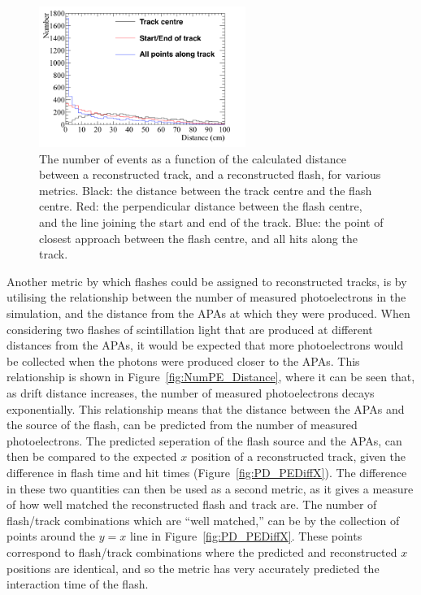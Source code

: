 \begin{figure}
  \centering
  \includegraphics[width=0.6\textwidth]{DiffTrackSeps}
  \caption[Matching tracks and flashes in the 35 ton using positions in the $yz$ plane]
          {The number of events as a function of the calculated distance between a reconstructed track, and a reconstructed flash, for various metrics. Black: the distance between the track centre and the flash centre. Red: the perpendicular distance between the flash centre, and the line joining the start and end of the track. Blue: the point of closest approach between the flash centre, and all hits along the track.}
  \label{fig:PDYZDist}
\end{figure}

Another metric by which flashes could be assigned to reconstructed tracks, is by utilising the relationship between the number of measured photoelectrons in the simulation, and the distance from the APAs at which they were produced. When considering two flashes of scintillation light that are produced at different distances from the APAs, it would be expected that more photoelectrons would be collected when the photons were produced closer to the APAs. This relationship is shown in Figure~\ref{fig:NumPE_Distance}, where it can be seen that, as drift distance increases, the number of measured photoelectrons decays exponentially. This relationship means that the distance between the APAs and the source of the flash, can be predicted from the number of measured photoelectrons. The predicted seperation of the flash source and the APAs, can then be compared to the expected $x$ position of a reconstructed track, given the difference in flash time and hit times (Figure~\ref{fig:PD_PEDiffX}). The difference in these two quantities can then be used as a second metric, as it gives a measure of how well matched the reconstructed flash and track are. The number of flash/track combinations which are ``well matched,'' can be by the collection of points around the $y=x$ line in Figure~\ref{fig:PD_PEDiffX}. These points correspond to flash/track combinations where the predicted and reconstructed $x$ positions are identical, and so the metric has very accurately predicted the interaction time of the flash. \\

